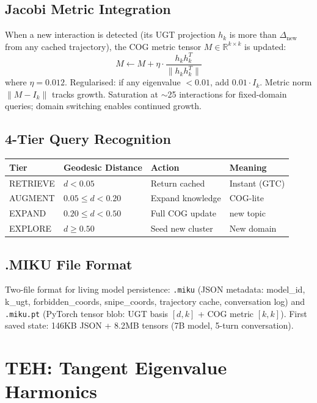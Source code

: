 \documentclass[11pt]{article}
\begin{document}
\subsection{Jacobi Metric Integration}
When a new interaction is detected (its UGT projection $h_k$ is more than $\Delta_{\mathrm{new}}$ from any cached trajectory), the COG metric tensor $M \in \mathbb{R}^{k \times k}$ is updated:
\begin{equation}
M \leftarrow M + \eta \cdot \frac{h_k h_k^T}{\|h_k h_k^T\|}
\end{equation}
where $\eta = 0.012$. Regularised: if any eigenvalue $<0.01$, add $0.01 \cdot I_k$. Metric norm $\|M - I_k\|$ tracks growth. Saturation at $\sim$25 interactions for fixed-domain queries; domain switching enables continued growth.

\subsection{4-Tier Query Recognition}

\begin{table}[h]\centering
\begin{tabular}{llll}\toprule
Tier & Geodesic Distance & Action & Meaning \\\midrule
RETRIEVE & $d < 0.05$ & Return cached & Instant (GTC) \\
AUGMENT & $0.05 \le d < 0.20$ & Expand knowledge & COG-lite \\
EXPAND & $0.20 \le d < 0.50$ & Full COG update & new topic \\
EXPLORE & $d \ge 0.50$ & Seed new cluster & New domain \\\bottomrule
\end{tabular}
\end{table}

\subsection{.MIKU File Format}
Two-file format for living model persistence: \texttt{.miku} (JSON metadata: model\_id, k\_ugt, forbidden\_coords, snipe\_coords, trajectory cache, conversation log) and \texttt{.miku.pt} (PyTorch tensor blob: UGT basis $[d,k]$ + COG metric $[k,k]$). First saved state: 146KB JSON + 8.2MB tensors (7B model, 5-turn conversation).


\section{TEH: Tangent Eigenvalue Harmonics}
\end{document}

